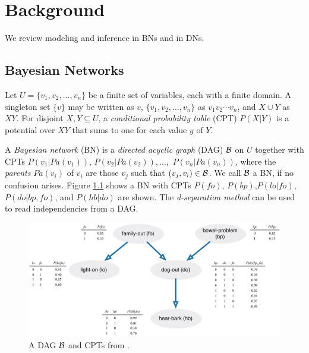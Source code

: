 \chapter{Background}
\label{sec:background}

\reversemarginpar

We review modeling and inference in BNs and in DNs.

\section{Bayesian Networks}
\label{sec:baysian_networks}

Let $U = \{ v_1, v_2, \ldots , v_n \}$ be a finite set of variables, each with a finite domain.
A singleton set $\{v\}$ may be written as $v$, $\{ v_1, v_2, \ldots, v_n \}$ as $v_1 v_2 \cdots v_n$, and $X \cup Y$ as $XY$.
For disjoint $X,Y \subseteq U$, a \emph{conditional probability table} (CPT) $P(X|Y)$ is a potential over $XY$ that sums to one for each value $y$ of $Y$.

A \emph{Bayesian network} (BN) \cite{pear88} is a \emph{directed acyclic graph} (DAG) $\cal{B}$ on $U$ together with CPTs $P(v_1 | Pa(v_1))$, $P(v_2|Pa(v_2)),$$\ldots,$ $P(v_n|Pa(v_n))$, where the \emph{parents} $Pa(v_i)$ of $v_i$ are those $v_j$ such that $(v_j,v_i) \in \cal{B}$.
We call $\cal{B}$ a BN, if no confusion arises.
Figure \ref{fig:dag} shows a BN with CPTs $P(fo)$, $P(bp)$,$P(lo|fo)$, $P(do|bp,fo)$, and $P(hb|do)$ are shown.
The \emph{d-separation method} \cite{pear88} can be used to read independencies from a DAG.

\begin{figure}[hbt]
    \begin{center}
        \includegraphics[width=\textwidth]{img/DAG_darwiche}
    \end{center}
    \caption{A DAG ${\cal B}$ and CPTs from \cite{darwiche09}.}
    \label{fig:dag}
\end{figure}

